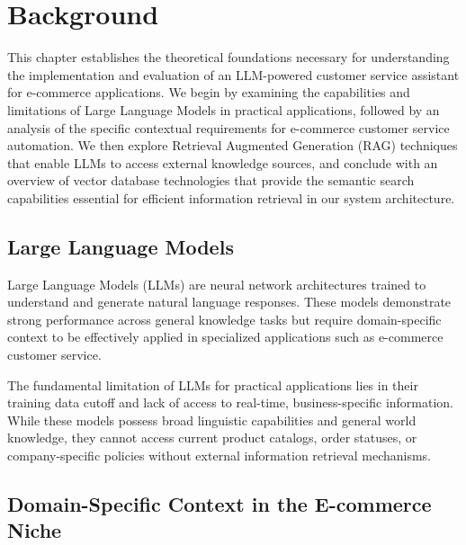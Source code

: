 \chapter{Background}
\label{cha:background}

This chapter establishes the theoretical foundations necessary for understanding the implementation and evaluation of an LLM-powered customer service assistant for e-commerce applications. We begin by examining the capabilities and limitations of Large Language Models in practical applications, followed by an analysis of the specific contextual requirements for e-commerce customer service automation. We then explore Retrieval Augmented Generation (RAG) techniques that enable LLMs to access external knowledge sources, and conclude with an overview of vector database technologies that provide the semantic search capabilities essential for efficient information retrieval in our system architecture.

\section{Large Language Models}

Large Language Models (LLMs) are neural network architectures trained to understand and generate natural language responses. These models demonstrate strong performance across general knowledge tasks but require domain-specific context to be effectively applied in specialized applications such as e-commerce customer service.

The fundamental limitation of LLMs for practical applications lies in their training data cutoff and lack of access to real-time, business-specific information.
While these models possess broad linguistic capabilities and general world knowledge, they cannot access current product catalogs, order statuses, or company-specific policies without external information retrieval mechanisms.

\section{Domain-Specific Context in the E-commerce Niche}

